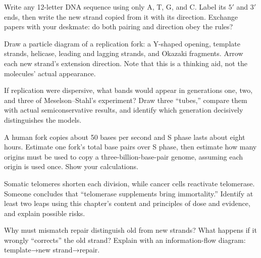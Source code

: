 \begin{sikaoti}
\item Write any 12-letter DNA sequence using only A, T, G, and C. Label its $5'$ and $3'$ ends, then write the new strand copied from it with its direction. Exchange papers with your deskmate: do both pairing and direction obey the rules?
\item Draw a particle diagram of a replication fork: a Y-shaped opening, template strands, helicase, leading and lagging strands, and Okazaki fragments. Arrow each new strand's extension direction. Note that this is a thinking aid, not the molecules' actual appearance.
\item If replication were dispersive, what bands would appear in generations one, two, and three of Meselson--Stahl's experiment? Draw three ``tubes,'' compare them with actual semiconservative results, and identify which generation decisively distinguishes the models.
\item A human fork copies about 50 bases per second and S phase lasts about eight hours. Estimate one fork's total base pairs over S phase, then estimate how many origins must be used to copy a three-billion-base-pair genome, assuming each origin is used once. Show your calculations.
\item Somatic telomeres shorten each division, while cancer cells reactivate telomerase. Someone concludes that ``telomerase supplements bring immortality.'' Identify at least two leaps using this chapter's content and principles of dose and evidence, and explain possible risks.
\item Why must mismatch repair distinguish old from new strands? What happens if it wrongly ``corrects'' the old strand? Explain with an information-flow diagram: template→new strand→repair.
\end{sikaoti}

